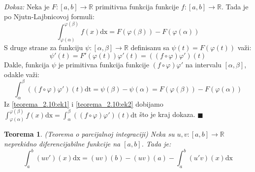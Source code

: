 \documentclass{article}
\newtheorem{teorema}{Teorema}[section]
\begin{document}
\textit{Dokaz:} Neka je $F:\left[a,b\right]\longrightarrow \mathbb{R}$ primitivna funkcija funkcije $f:\left[a,b\right]\longrightarrow\mathbb{R}$. Tada je po Njutn-Lajbnicovoj formuli:
\begin{equation}
    \label{teorema_2.10:ek1}
    \displaystyle\int^{\varphi\left(\beta\right)}_{\varphi\left(\alpha\right)}f\left(x\right)\text{dx} = F\left(\varphi\left(\beta\right)\right)-F\left(\varphi\left(\alpha\right)\right)
\end{equation}
S druge strane za funkciju $\psi:\left[\alpha,\beta\right]\longrightarrow\mathbb{R}$ definisanu sa $\psi\left(t\right) = F\left(\varphi\left(t\right)\right)$ važi:
\begin{equation*}
    \psi'\left(t\right) = F'\left(\varphi\left(t\right)\right)\varphi'\left(t\right) = \left(\left(f\circ\varphi\right)\varphi'\right)\left(t\right)
\end{equation*}
Dakle, funkcija $\psi$ je primitivna funkcija funkcije $\left(f\circ\varphi\right)\varphi'$ na intervalu $\left[\alpha,\beta\right]$, odakle važi:
\begin{equation}
    \displaystyle\int^\beta_\alpha \left(\left(f\circ\varphi\right)\varphi'\right)\left(t\right)\text{dt} = \psi\left(\beta\right) - \psi\left(\alpha\right) = F\left(\varphi\left(\beta\right)\right) - F\left(\varphi\left(\alpha\right)\right)
    \label{teorema_2.10:ek2}
\end{equation}
Iz \eqref{teorema_2.10:ek1} i \eqref{teorema_2.10:ek2} dobijamo $\displaystyle\int^{\varphi\left(\beta\right)}_{\varphi\left(\alpha\right)} f\left(x\right)\text{dx} = \int^\beta_\alpha \left(\left(f\circ\varphi\right)\varphi'\right)\left(t\right)\text{dt}$ što je kraj dokaza.
\null\hfill $\blacksquare$\par

\begin{teoremabox}
    \label{teorema_2.11}
    \begin{teorema}
        (Teorema o parcijalnoj integraciji) Neka su $u, v: \left[a, b\right] \longrightarrow\mathbb{R}$ neprekidno diferencijabilne funkcije na $\left[a,b\right]$. Tada je:
        $$\displaystyle\int^b_a\left(uv'\right)\left(x\right)\text{dx} = \left(uv\right)\left(b\right) - \left(uv\right)\left(a\right) - \int^b_a\left(u'v\right)\left(x\right)\text{dx}$$
    \end{teorema}
\end{teoremabox}
\end{document}
